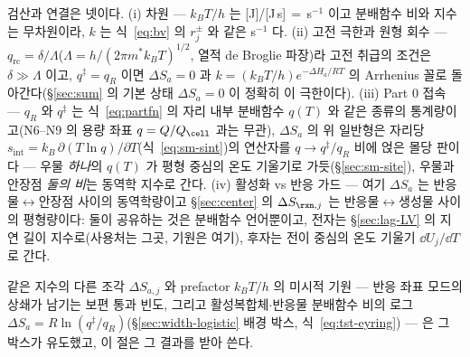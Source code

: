 \begin{bgbox}
검산과 연결은 넷이다. (i) 차원 --- $k_BT/h$ 는 [J]/[J\,s]$\,=\,$s$^{-1}$ 이고 분배함수 비와 지수는
무차원이라, $k$ 는 식~\eqref{eq:bv} 의 $r_j^{\pm}$ 와 같은 s$^{-1}$ 다. (ii) 고전 극한과 원형 회수 ---
$q_\mathrm{rc}=\delta/\Lambda$($\Lambda=h/(2\pi m^{*}k_BT)^{1/2}$, 열적 de Broglie 파장)라 고전 취급의
조건은 $\delta\gg\Lambda$ 이고, $q^{\ddagger}=q_R$ 이면 $\Delta S_a=0$ 과
$k=(k_BT/h)e^{-\Delta H_a/RT}$ 의 Arrhenius 꼴로 돌아간다(\S\ref{sec:sum} 의 기본 상태
$\Delta S_a{=}0$ 이 정확히 이 극한이다). (iii) Part 0 접속 --- $q_R$ 와 $q^{\ddagger}$ 는
식~\eqref{eq:partfn} 의 자리 내부 분배함수 $q(T)$ 와 같은 종류의 통계량이고(N6--N9 의 용량 좌표
$q=Q/Q_\cell$ 과는 무관), $\Delta S_a$ 의 위 일반형은 자리당
$s_\mathrm{int}=k_B\,\partial(T\ln q)/\partial T$(식~\eqref{eq:sm-sint})의 연산자를
$q\to q^{\ddagger}/q_R$ 비에 얹은 몰당 판이다 --- 우물 \emph{하나}의 $q(T)$ 가 평형 중심의 온도
기울기로 가듯(\S\ref{sec:sm-site}), 우물과 안장점 \emph{둘의 비}는 동역학 지수로 간다.
(iv) 활성화 vs 반응 가드 --- 여기 $\Delta S_a$ 는 반응물$\leftrightarrow$안장점 사이의 동역학량이고
\S\ref{sec:center} 의 $\Delta S_{\rxn,j}$ 는 반응물$\leftrightarrow$생성물 사이의 평형량이다: 둘이
공유하는 것은 분배함수 언어뿐이고, 전자는 \S\ref{sec:lag-LV} 의 지연 길이 지수로(사용처는 그곳,
기원은 여기), 후자는 전이 중심의 온도 기울기 $\dd U_j/\dd T$ 로 간다.
\end{bgbox}

같은 지수의 다른 조각 $\Delta S_{a,j}$ 와 prefactor $k_BT/h$ 의 미시적 기원 --- 반응 좌표 모드의
상쇄가 남기는 보편 통과 빈도, 그리고 활성복합체$\cdot$반응물 분배함수 비의 로그
$\Delta S_a=R\ln(q^{\ddagger}/q_R)$(\S\ref{sec:width-logistic} 배경 박스, 식~\eqref{eq:tst-eyring}) ---
은 그 박스가 유도했고, 이 절은 그 결과를 받아 쓴다.
